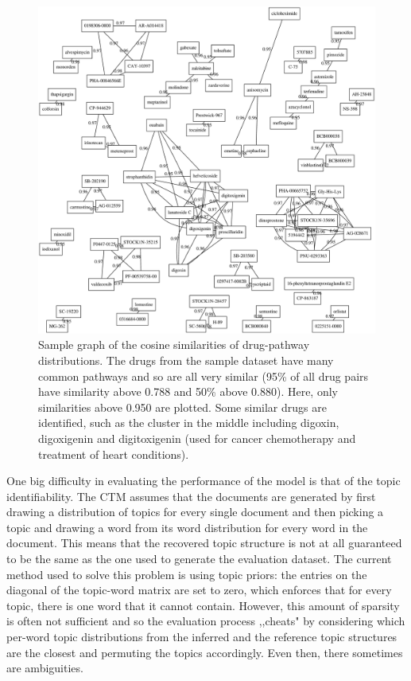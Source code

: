 \documentclass[12pt,a4]{article}
\begin{document}
\begin{figure}[!htb]
\includegraphics[width=\textwidth]{progress-report-drugs.eps}
\caption{Sample graph of the cosine similarities of drug-pathway distributions. The drugs from the sample dataset have many common pathways and so are all very similar (95\% of all drug pairs have similarity above 0.788 and 50\% above 0.880). Here, only similarities above 0.950 are plotted. Some similar drugs are identified, such as the cluster in the middle including digoxin, digoxigenin and digitoxigenin (used for cancer chemotherapy and treatment of heart conditions).}
\end{figure}

One big difficulty in evaluating the performance of the model is that of the topic identifiability. The CTM assumes that the documents are generated by first drawing a distribution of topics for every single document and then picking a topic and drawing a word from its word distribution for every word in the document. This means that the recovered topic structure is not at all guaranteed to be the same as the one used to generate the evaluation dataset. The current method used to solve this problem is using topic priors: the entries on the diagonal of the topic-word matrix are set to zero, which enforces that for every topic, there is one word that it cannot contain. However, this amount of sparsity is often not sufficient and so the evaluation process
,,cheats" by considering which per-word topic distributions from the inferred and the reference topic structures are the closest and permuting the topics accordingly. Even then, there sometimes are ambiguities.
\end{document}
